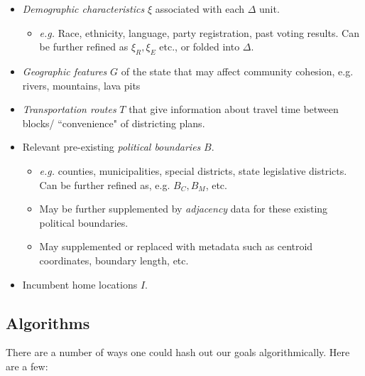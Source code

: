 \documentclass{article}
\begin{document}
\begin{itemize}
    \item \textit{Demographic characteristics} $\xi$ associated with each $\Delta$ unit.
    \begin{itemize}
    	\item \textit{e.g.} Race, ethnicity, language, party registration, past voting results. Can be further refined as $\xi_R, \xi_E$ etc., or folded into $\Delta$.
    \end{itemize} 
    \item \textit{Geographic features} $G$ of the state that may affect community cohesion, e.g. rivers, mountains, lava pits
    \item \textit{Transportation routes} $T$ that give information about travel time between blocks/ ``convenience" of districting plans.
    \item Relevant pre-existing \textit{political boundaries} $B$.
    \begin{itemize}
        \item \textit{e.g.} counties, municipalities, special districts, state legislative districts. Can be further refined as, e.g. $B_{C}, B_{M}$, etc. 
        \item May be further supplemented by \textit{adjacency} data for these existing political boundaries.
        \item May supplemented or replaced with metadata such as centroid coordinates, boundary length, etc.
    \end{itemize}
    \item Incumbent home locations $I$.
    
\end{itemize}

\subsection{Algorithms}

There are a number of ways one could hash out our goals algorithmically. Here are a few:
\end{document}
